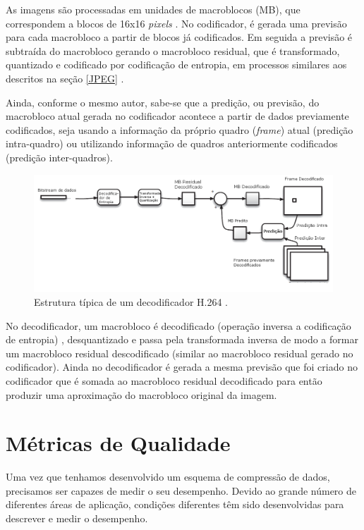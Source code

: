 As imagens são processadas em unidades de macroblocos (MB), que correspondem a blocos de 16x16 \textit{pixels} \cite{richardson2011h}. No codificador, é gerada uma previsão para cada macrobloco a partir de blocos já codificados. Em seguida a previsão é subtraída do macrobloco gerando o macrobloco residual, que é transformado, quantizado e codificado por codificação de entropia, em processos similares aos descritos na seção \ref{JPEG} .

Ainda, conforme o mesmo autor, sabe-se que a predição, ou previsão, do macrobloco atual gerada no codificador acontece a partir de dados previamente codificados, seja usando a informação da próprio quadro (\textit{frame}) atual (predição intra-quadro) ou utilizando informação de quadros anteriormente codificados (predição inter-quadros).
  
\begin{figure}[h]
	\centering
	\includegraphics[scale=0.45]{figuras/H264_DECODIFICADOR.png}
	\caption{Estrutura típica de um decodificador H.264 \cite{richardson2011h}.}
	\label{H264_DECODER}
\end{figure}

No decodificador, um macrobloco é decodificado (operação inversa a codificação de entropia) , desquantizado e passa pela transformada inversa de modo a formar um macrobloco residual descodificado (similar ao macrobloco residual gerado no codificador). Ainda no decodificador é gerada a mesma previsão que foi criado no codificador que é somada ao macrobloco residual decodificado para então produzir uma aproximação do macrobloco original da imagem. \cite{richardson2011h}

\section{Métricas de Qualidade}
Uma vez que tenhamos desenvolvido um esquema de compressão de dados, precisamos ser capazes de medir o seu desempenho. Devido ao grande número de diferentes áreas de aplicação, condições diferentes têm sido desenvolvidas para descrever e medir o desempenho.\cite{sayood2012introduction}

